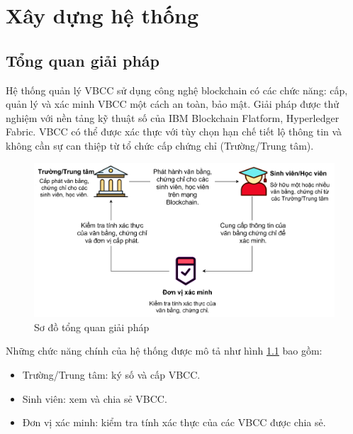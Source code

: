 \chapter{Xây dựng hệ thống}
\section{Tổng quan giải pháp}
Hệ thống quản lý VBCC sử dụng công nghệ blockchain có các chức năng: cấp, quản lý và xác minh VBCC một cách an toàn, bảo mật. Giải pháp được thử nghiệm với nền tảng kỹ thuật số của IBM Blockchain Flatform, Hyperledger Fabric. VBCC có thể được xác thực với tùy chọn hạn chế tiết lộ thông tin và không cần sự can thiệp từ tổ chức cấp chứng chỉ (Trường/Trung tâm).

\begin{figure}[htbp]
\centering
\includegraphics[width=.9\linewidth]{img/vbcc.jpg}
\caption{Sơ đồ tổng quan giải pháp}
\label{fig:vbcc}

\end{figure}
Những chức năng chính của hệ thống được mô tả như hình \ref{fig:vbcc} bao gồm:
\begin{itemize}
\item Trường/Trung tâm: ký số và cấp VBCC.
\item Sinh viên: xem và chia sẻ VBCC.
\item Đơn vị xác minh: kiểm tra tính xác thực của các VBCC được chia sẻ.
\end{itemize}


